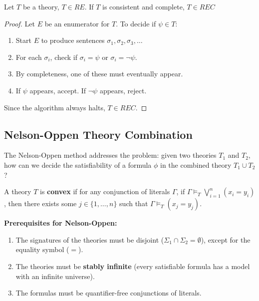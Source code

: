 \documentclass{article}
\newtheorem{theorem}{Theorem}[section]
\newtheorem{definition}[theorem]{Definition}
\let\olddefinition\definition
\let\endolddefinition\enddefinition
\renewenvironment{definition}
  {\begin{tcolorbox}[
      colback=red!10,
      colframe=red!50!black,
      boxrule=0.6pt,
      arc=2pt,
      left=6pt,right=6pt,top=4pt,bottom=4pt,
      breakable
    ]\olddefinition}
  {\endolddefinition\end{tcolorbox}}
\let\oldtheorem\theorem
\let\endoldtheorem\endtheorem
\renewenvironment{theorem}
  {\begin{tcolorbox}[
      colback=yellow!6,
      colframe=yellow!60!black,
      boxrule=0.6pt,
      arc=2pt,
      left=6pt,right=6pt,top=4pt,bottom=4pt,
      parbox=false
    ]\oldtheorem}
  {\endoldtheorem\end{tcolorbox}}
\begin{document}
\begin{theorem}
    Let $T$ be a theory, $T \in RE$. 
    If $T$ is consistent and complete, $T \in REC$
\end{theorem}

\begin{proof}
    Let $E$ be an enumerator for $T$. To decide if $\psi \in T$:
    \begin{enumerate}
        \item Start $E$ to produce sentences $\sigma_1, \sigma_2, \sigma_3, \dots$
        \item For each $\sigma_i$, check if $\sigma_i = \psi$ or $\sigma_i = \neg \psi$.
        \item By completeness, one of these must eventually appear.
        \item If $\psi$ appears, accept. If $\neg \psi$ appears, reject.
    \end{enumerate}
    Since the algorithm always halts, $T \in REC$.
\end{proof}





\subsection{Nelson-Oppen Theory Combination}
The Nelson-Oppen method addresses the problem: given two theories $T_1$ and $T_2$, how can we decide the satisfiability of a formula $\phi$ in the combined theory $T_1 \cup T_2$?\begin{definition}[Convex Theory]A theory $T$ is \textbf{convex} if for any conjunction of literals $\Gamma$, if $\Gamma \vDash_T \bigvee_{i=1}^n (x_i = y_i)$, then there exists some $j \in \{1, \dots, n\}$ such that $\Gamma \vDash_T (x_j = y_j)$.\end{definition}\textbf{Prerequisites for Nelson-Oppen:}\begin{enumerate}\item The signatures of the theories must be disjoint ($\Sigma_1 \cap \Sigma_2 = \emptyset$), except for the equality symbol ($=$).\item The theories must be \textbf{stably infinite} (every satisfiable formula has a model with an infinite universe).\item The formulas must be quantifier-free conjunctions of literals.\end{enumerate}
\end{document}
